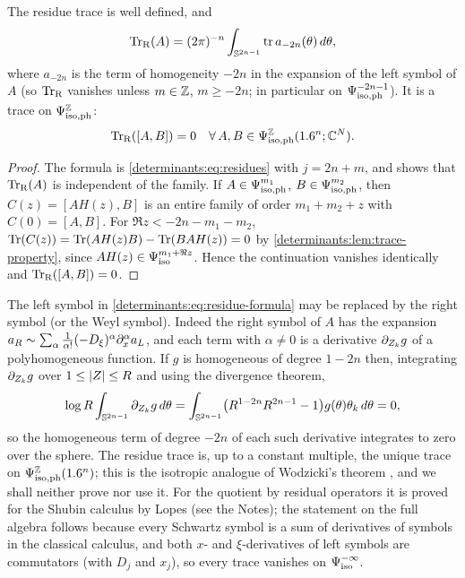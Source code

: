 \begin{proposition}\label{determinants:prop:residue-trace}
  The residue trace is well defined, and
  \begin{equation}\label{determinants:eq:residue-formula}
    \operatorname{Tr}_{\mathrm{R}}(A)=(2\pi)^{-n}\int_{\mathbb{S}^{2n-1}}\operatorname{tr} a_{-2n}(\theta)\,d\theta,
  \end{equation}
  where $a_{-2n}$ is the term of homogeneity $-2n$ in the expansion of the
  left symbol of $A$ (so $\operatorname{Tr}_{\mathrm{R}}$ vanishes unless $m\in\mathbb{Z}$, $m\ge-2n$; in
  particular on $\Psi^{-2n-1}_{\mathrm{iso,ph}}$). It is a trace on $\Psi^{\mathbb{Z}}_{\mathrm{iso,ph}}$:
  \begin{equation}\label{determinants:eq:residue-trace-property}
    \operatorname{Tr}_{\mathrm{R}}([A,B])=0\quad\forall\,A,B\in\Psi^{\mathbb{Z}}_{\mathrm{iso,ph}}(1.6^n;\mathbb{C}^N).
  \end{equation}
\end{proposition}
\begin{proof}
  The formula is \eqref{determinants:eq:residues} with $j=2n+m$, and shows that
  $\operatorname{Tr}_{\mathrm{R}}(A)$ is independent of the family. If $A\in\Psi^{m_1}_{\mathrm{iso,ph}}$,
  $B\in\Psi^{m_2}_{\mathrm{iso,ph}}$, then $C(z)=[AH(z),B]$ is an entire family of order
  $m_1+m_2+z$ with $C(0)=[A,B]$. For $\Re z<-2n-m_1-m_2$,
  $\operatorname{Tr}(C(z))=\operatorname{Tr}(AH(z)B)-\operatorname{Tr}(BAH(z))=0$ by
  \cref{determinants:lem:trace-property}, since $AH(z)\in\Psi^{m_1+\Re z}_{\mathrm{iso}}$.
  Hence the continuation vanishes identically and $\operatorname{Tr}_{\mathrm{R}}([A,B])=0$.
\end{proof}

\begin{remark}\label{determinants:rem:residue-other-symbols}
  The left symbol in \eqref{determinants:eq:residue-formula} may be replaced
  by the right symbol (or the Weyl symbol). Indeed the right symbol of $A$ has
  the expansion $a_R\sim\sum_\alpha\frac1{\alpha!}(-D_\xi)^\alpha\partial_x^\alpha a_L$,
  and each term with $\alpha\ne0$ is a derivative $\partial_{Z_k}g$ of a
  polyhomogeneous function. If $g$ is homogeneous of degree $1-2n$ then,
  integrating $\partial_{Z_k}g$ over $1\le\lvert Z\rvert\le R$ and using the divergence
  theorem,
  \begin{equation*}
    \log R\int_{\mathbb{S}^{2n-1}}\partial_{Z_k}g\,d\theta
    =\int_{\mathbb{S}^{2n-1}}\bigl(R^{1-2n}R^{2n-1}-1\bigr)g(\theta)\theta_k\,d\theta=0,
  \end{equation*}
  so the homogeneous term of degree $-2n$ of each such derivative integrates to
  zero over the sphere. The residue trace is, up to a constant multiple, the
  unique trace on $\Psi^{\mathbb{Z}}_{\mathrm{iso,ph}}(1.6^n)$; this is the isotropic analogue of
  Wodzicki's theorem \cite{Wodzicki-residue}, and we shall neither prove nor
  use it. For the quotient by residual operators it is proved for the
  Shubin calculus by Lopes (see the Notes); the statement on the full algebra
  follows because every Schwartz symbol is a sum of derivatives of symbols in
  the classical calculus, and both $x$- and $\xi$-derivatives of left symbols
  are commutators (with $D_j$ and $x_j$), so every trace vanishes on
  $\Psi^{-\infty}_{\mathrm{iso}}$.
\end{remark}

